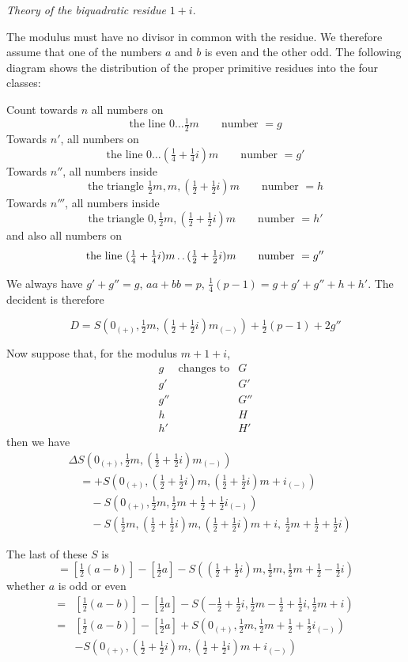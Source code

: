 \begin{center}\emph{Theory of the biquadratic residue} $1+i$.\end{center}
The modulus must have no divisor in common with the residue. We therefore assume that one of the numbers $a$ and $b$ is even and the other odd. The following diagram shows the distribution of the proper primitive residues into the four classes:
\begin{center}\resizebox{.90\textwidth}{!}{}\end{center}

Count towards $n$ all numbers on
\[
\text{the line }0\ldots\tfrac12m\qquad\text{number }=g
\]
Towards $n'$, all numbers on
\[
\text{the line }0\ldots(\tfrac14+\tfrac14i)m\qquad\text{number }=g'
\]
Towards $n''$, all numbers inside
\[
\text{the triangle }\tfrac12m,m,(\tfrac12+\tfrac12i)m\qquad\text{number }=h
\]
Towards $n'''$, all numbers inside
\[
\text{the triangle }0,\tfrac12m,(\tfrac12+\tfrac12i)m\qquad\text{number }=h'
\]
and also all numbers on
\[
\text{the line }(\tfrac14+\tfrac14i)m\mathinner{.\,.}(\tfrac12+\tfrac12i)m\qquad\text{number }=g''
\]

We always have $g'+g''=g$, $aa+bb=p$, $\frac14(p-1)=g+g'+g''+h+h'$. The decident is therefore

\[
D=S(0_{(+)},\tfrac12m,(\tfrac12+\tfrac12i)m_{(-)})+\tfrac12(p-1)+2g''
\]

Now suppose that, for the modulus $m+1+i$,
\[
\begin{array}{clc}
g&\text{changes to}&G\\
g'&&G'\\
g''&&G''\\
h&&H\\
h'&&H'
\end{array}
\]
then we have
\[
\begin{aligned}
&\Delta S(0_{(+)},\tfrac12m,(\tfrac12+\tfrac12i)m_{(-)})\\
&\quad=+S(0_{(+)},(\tfrac12+\tfrac12i)m,(\tfrac12+\tfrac12i)m+i_{(-)})\\
&\qquad-S(0_{(+)},\tfrac12m,\tfrac12m+\tfrac12+\tfrac12i_{(-)})\\
&\qquad-S(\tfrac12m,(\tfrac12+\tfrac12i)m,(\tfrac12+\tfrac12i)m+i,\ \tfrac12m+\tfrac12+\tfrac12i)
\end{aligned}
\]

The last of these $S$ is
\[
=\left[\tfrac12(a-b)\right]-\left[\tfrac12a\right]-S((\tfrac12+\tfrac12i)m,\tfrac12m,\tfrac12m+\tfrac12-\tfrac12i)
\]
whether $a$ is odd or even
\[
\begin{aligned}
={}&\left[\tfrac12(a-b)\right]-\left[\tfrac12a\right]-S(-\tfrac12+\tfrac12i,\tfrac12m-\tfrac12+\tfrac12i,\tfrac12m+i)\\
={}&\left[\tfrac12(a-b)\right]-\left[\tfrac12a\right]+S(0_{(+)},\tfrac12m,\tfrac12m+\tfrac12+\tfrac12i_{(-)})\\
&-S(0_{(+)},(\tfrac12+\tfrac12i)m,(\tfrac12+\tfrac12i)m+i_{(-)})
\end{aligned}
\]

